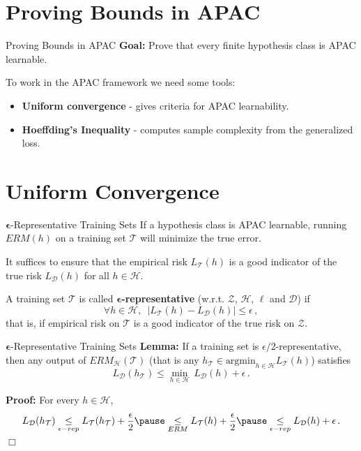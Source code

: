 \documentclass[10pt, table, handout]{beamer}
\newcommand{\cT}{\ensuremath{\mathcal{T}}}
\newcommand{\cD}{\ensuremath{\mathcal{D}}}
\newcommand{\cZ}{\ensuremath{\mathcal{Z}}}
\newcommand{\cH}{\ensuremath{\mathcal{H}}}
\begin{document}

\section{Proving Bounds in APAC}

\begin{frame}[fragile]{Proving Bounds in APAC}
\textbf{Goal:} Prove that every finite hypothesis class is APAC learnable. \newline\pause

To work in the APAC framework we need some tools: 

\begin{itemize}
\item[] \textbf{Uniform convergence} - gives criteria for APAC learnability.
\item[] \textbf{Hoeffding's Inequality} - computes sample complexity from the generalized loss. 
\end{itemize}


\end{frame}


\section{Uniform Convergence}

\begin{frame}[fragile]{$\mathbf{\epsilon}$-Representative Training Sets}
If a hypothesis class is APAC learnable, running $ERM(h)$ on a training set $\mathcal{T}$ will minimize the true error.\newline

It suffices to ensure that the empirical risk $L_\cT(h)$ is a good indicator of the true risk $L_\cD(h)$ for all $h\in \cH$. \pause

A training set $\mathcal{T}$ is called \textbf{$\mathbf{\epsilon}$-representative} (w.r.t. $\cZ$, $\cH$, $\ell$ and $\cD$) if
$$
\forall h\in \mathcal{H},\,\,\, |L_\cT(h) - L_\cD(h)|\leq \epsilon\,,
$$\pause
that is, if empirical risk on $\cT$ is a good indicator of the true risk on $\cZ$. 

\end{frame}




\begin{frame}[fragile]{$\mathbf{\epsilon}$-Representative Training Sets}
\textbf{Lemma:} If a training set is $\epsilon/2$-representative, then any output of $ERM_\cH(\cT)$ (that is any $h_\cT\in \text{argmin}_{h\in\cH}L_\cT(h)$) satisfies 
$$
L_\cD(h_\cT) \leq \min_{h\in \cH}\, L_\cD(h) + \epsilon\,.
$$\pause

\textbf{Proof:} For every $h\in \cH$, 
$$
L_\cD(h_\cT)  \underset{\epsilon-rep}{\leq} L_\cT(h_\cT) + \frac\epsilon2 \pause \underset{ERM}{\leq}  L_\cT(h) + \frac\epsilon2  \pause \underset{\epsilon-rep}{\leq}  L_\cD(h) + \epsilon\,.
$$
\hspace*{\fill}$\Box$

\end{frame}
\end{document}
